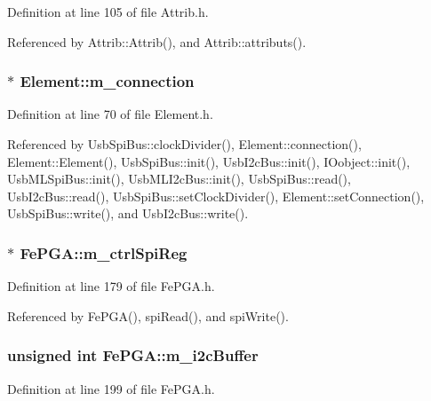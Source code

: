 Definition at line 105 of file Attrib.h.

Referenced by Attrib::Attrib(), and Attrib::attributs().\hypertarget{classElement_abe3de7a5dbbc9a6dd2d7e012e5fdb266}{
\subsubsection[{m\_\-connection}]{$\ast$ {\bf Element::m\_\-connection}}}
\label{classElement_abe3de7a5dbbc9a6dd2d7e012e5fdb266}


Definition at line 70 of file Element.h.

Referenced by UsbSpiBus::clockDivider(), Element::connection(), Element::Element(), UsbSpiBus::init(), UsbI2cBus::init(), IOobject::init(), UsbMLSpiBus::init(), UsbMLI2cBus::init(), UsbSpiBus::read(), UsbI2cBus::read(), UsbSpiBus::setClockDivider(), Element::setConnection(), UsbSpiBus::write(), and UsbI2cBus::write().\hypertarget{classFePGA_a8fb76733a688dff6d91892a49a97a21f}{
\subsubsection[{m\_\-ctrlSpiReg}]{$\ast$ {\bf FePGA::m\_\-ctrlSpiReg}}}
\label{classFePGA_a8fb76733a688dff6d91892a49a97a21f}


Definition at line 179 of file FePGA.h.

Referenced by FePGA(), spiRead(), and spiWrite().\hypertarget{classFePGA_a173664ffd6a73f454ae31f51e689dd16}{
\subsubsection[{m\_\-i2cBuffer}]{\setlength{\rightskip}{0pt plus 5cm}unsigned int {\bf FePGA::m\_\-i2cBuffer}}}
\label{classFePGA_a173664ffd6a73f454ae31f51e689dd16}


Definition at line 199 of file FePGA.h.


